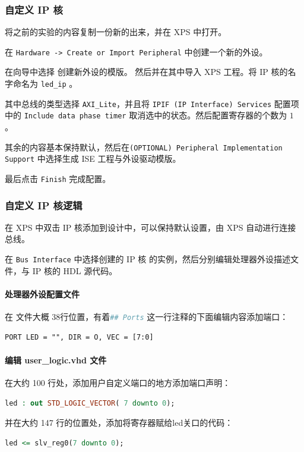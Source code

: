 \documentclass{ctexart}
\begin{document}
\subsubsection{自定义 IP 核}

将之前的实验的内容复制一份新的出来，并在 XPS 中打开。

在 \verb|Hardware -> Create or Import Peripheral| 中创建一个新的外设。

在向导中选择 创建新外设的模版。
然后并在其中导入 XPS 工程。将 IP 核的名字命名为 \verb|led_ip| 。

其中总线的类型选择 \verb|AXI_Lite|，并且将 \verb|IPIF (IP Interface) Services| 配置项中的 \verb|Include data phase timer| 取消选中的状态。然后配置寄存器的个数为 $1$ 。

其余的内容基本保持默认，然后在\verb|(OPTIONAL) Peripheral Implementation Support| 中选择生成 ISE 工程与外设驱动模版。

最后点击 \verb|Finish| 完成配置。

\subsubsection{自定义 IP 核逻辑}

在 XPS 中双击 IP 核添加到设计中，可以保持默认设置，由 XPS 自动进行连接总线。

在 \verb|Bus Interface| 中选择创建的 IP 核 的实例，然后分别编辑处理器外设描述文件，与 IP 核的 HDL 源代码。

\paragraph{处理器外设配置文件}

在 文件大概 38行位置，有着\lstinline[language=bash]|## Ports| 这一行注释的下面编辑内容添加端口：
\begin{lstlisting}
PORT LED = "", DIR = O, VEC = [7:0]
\end{lstlisting}

\paragraph{编辑 user\_logic.vhd 文件}

在大约 100 行处，添加用户自定义端口的地方添加端口声明：
\begin{lstlisting}[language=VHDL]
led : out STD_LOGIC_VECTOR( 7 downto 0);
\end{lstlisting}

并在大约 147 行的位置处，添加将寄存器赋给led关口的代码：
\begin{lstlisting}[language=VHDL]
led <= slv_reg0(7 downto 0);
\end{lstlisting}
\end{document}
